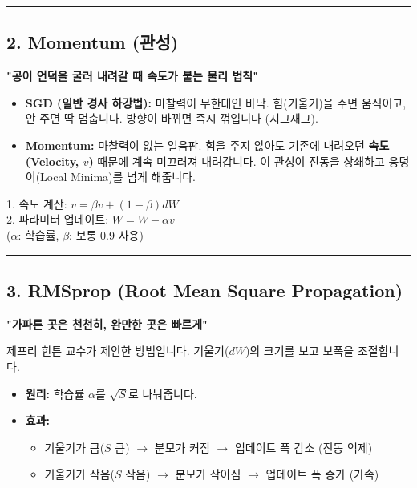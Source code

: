 \documentclass[11pt,a4paper]{book}
\theoremstyle{definition}
\begin{document}
\vspace{0.5cm}\hrule\vspace{0.5cm}

\subsection{2. Momentum (관성)}
\textbf{"공이 언덕을 굴러 내려갈 때 속도가 붙는 물리 법칙"}

\begin{analogybox}[title={얼음판 위의 쇠구슬}]
\begin{itemize}
    \item \textbf{SGD (일반 경사 하강법):} 마찰력이 무한대인 바닥. 힘(기울기)을 주면 움직이고, 안 주면 딱 멈춥니다. 방향이 바뀌면 즉시 꺾입니다 (지그재그).
    \item \textbf{Momentum:} 마찰력이 없는 얼음판. 힘을 주지 않아도 기존에 내려오던 \textbf{속도(Velocity, $v$)} 때문에 계속 미끄러져 내려갑니다. 이 관성이 진동을 상쇄하고 웅덩이(Local Minima)를 넘게 해줍니다.
\end{itemize}
\end{analogybox}

\begin{mathbox}[title={Update Rule}]
1. 속도 계산: $v = \beta v + (1-\beta) dW$ \\
2. 파라미터 업데이트: $W = W - \alpha v$ \\
($\alpha$: 학습률, $\beta$: 보통 0.9 사용)
\end{mathbox}

\vspace{0.5cm}\hrule\vspace{0.5cm}

\subsection{3. RMSprop (Root Mean Square Propagation)}
\textbf{"가파른 곳은 천천히, 완만한 곳은 빠르게"}

제프리 힌튼 교수가 제안한 방법입니다. 기울기($dW$)의 크기를 보고 보폭을 조절합니다.
\begin{itemize}
    \item \textbf{원리:} 학습률 $\alpha$를 $\sqrt{S}$로 나눠줍니다.
    \item \textbf{효과:} 
    \begin{itemize}
        \item 기울기가 큼($S$ 큼) $\rightarrow$ 분모가 커짐 $\rightarrow$ 업데이트 폭 감소 (진동 억제)
        \item 기울기가 작음($S$ 작음) $\rightarrow$ 분모가 작아짐 $\rightarrow$ 업데이트 폭 증가 (가속)
    \end{itemize}
\end{itemize}
\end{document}
